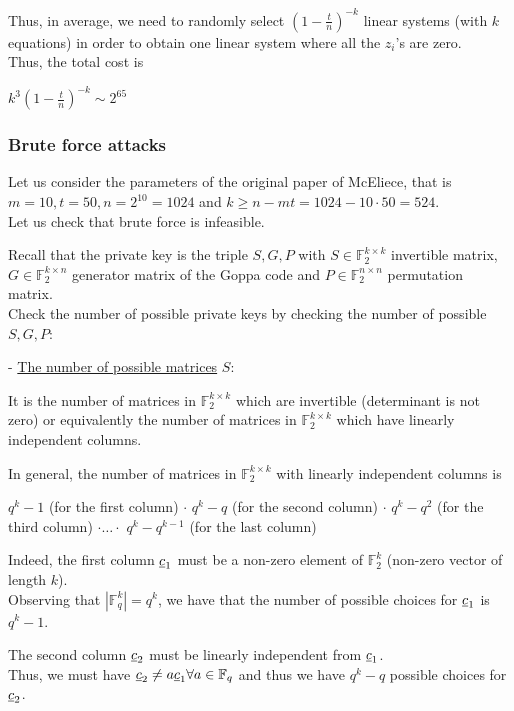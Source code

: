 \noindent
Thus, in average, we need to randomly select $(1 -\frac{t}{n})^{-k}$ linear systems (with $k$ equations) in order to obtain one linear system where all the $z_i$'s are zero.\\
Thus, the total cost is
\begin{center}
    $k^3(1 -\frac{t}{n})^{-k} \sim 2^{65}$
\end{center}
\newpage

\subsubsection*{Brute force attacks}
Let us consider the parameters of the original paper of McEliece, that is $m = 10, t = 50, n = 2^{10} = 1024$ and $k \geq n - mt = 1024 - 10 \cdot 50 = 524$.\\
Let us check that brute force is infeasible.
\medskip

\noindent
Recall that the private key is the triple $S, G, P$ with $S \in \mathbb{F}_2^{k \times k}$ invertible matrix, $G \in \mathbb{F}_2^{k \times n}$ generator matrix of the Goppa code and $P \in \mathbb{F}_2^{n \times n}$ permutation matrix.\\
Check the number of possible private keys by checking the number of possible $S, G, P$:
\vspace{1 cm}

\noindent
- \underline{The number of possible matrices} $S$:
\medskip

\noindent
It is the number of matrices in $\mathbb{F}_2^{k \times k}$ which are invertible (determinant is not zero) or equivalently the number of matrices in $\mathbb{F}_2^{k \times k}$ which have linearly independent columns.
\medskip

\noindent
In general, the number of matrices in $\mathbb{F}_2^{k \times k}$ with linearly independent columns is
\begin{center}
    $q^k - 1$ (for the first column) $\cdot$ $q^k - q$ (for the second column) $\cdot$ $q^k - q^2$ (for the third column) $\cdot \ldots \cdot$ $q^k - q^{k-1}$ (for the last column)
\end{center}
\noindent
Indeed, the first column $\underline{c}_1$ must be a non-zero element of $\mathbb{F}_2^k$ (non-zero vector of length $k$).\\
Observing that $|\mathbb{F}_q^k| = q^k$, we have that the number of possible choices for $\underline{c}_1$ is $q^k - 1$.
\medskip

\noindent
The second column $\underline{c}_2$ must be linearly independent from $\underline{c}_1$.\\
Thus, we must have $\underline{c}_2 \neq a\underline{c}_1 \forall a \in \mathbb{F}_q$ and thus we have $q^k - q$ possible choices for $\underline{c}_2$.
\medskip

